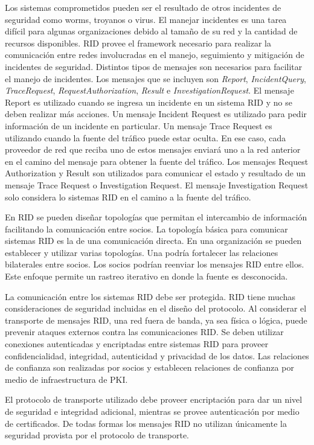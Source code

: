 Los sistemas comprometidos pueden ser el resultado de otros incidentes de 
seguridad como worms, troyanos o virus. El manejar incidentes es una tarea 
difícil para algunas organizaciones debido al tamaño de su red y la cantidad de 
recursos disponibles. RID provee el framework necesario para realizar la 
comunicación entre redes involucradas en el manejo, seguimiento y mitigación de 
incidentes de seguridad. Distintos tipos de mensajes son necesarios para 
facilitar el manejo de incidentes. Los mensajes que se incluyen son 
\emph{Report}, \emph{IncidentQuery}, \emph{TraceRequest}, 
\emph{RequestAuthorization}, \emph{Result} e \emph{InvestigationRequest}. El 
mensaje Report es utilizado cuando se ingresa un incidente en un sistema RID y 
no se deben realizar más acciones. Un mensaje Incident Request es utilizado para 
pedir información de un incidente en particular. Un mensaje Trace Request es 
utilizando cuando la fuente del tráfico puede estar oculta. En ese caso, cada 
proveedor de red que reciba uno de estos mensajes enviará uno a la red anterior 
en el camino del mensaje para obtener la fuente del tráfico. Los mensajes 
Request Authorization y Result son utilizados para comunicar el estado y 
resultado de un mensaje Trace Request o Investigation Request. El mensaje 
Investigation Request solo considera lo sistemas RID en el camino a la fuente 
del tráfico.

En RID se pueden diseñar topologías que permitan el intercambio de información 
facilitando la comunicación entre socios. La topología básica para comunicar 
sistemas RID es la de una comunicación directa. En una organización se pueden 
establecer y utilizar varias topologías. Una podría fortalecer las relaciones 
bilaterales entre socios. Los socios podrían reenviar los mensajes RID entre 
ellos. Este enfoque permite un rastreo iterativo en donde la fuente es 
desconocida.

La comunicación entre los sistemas RID debe ser protegida. RID tiene muchas 
consideraciones de seguridad incluidas en el diseño del protocolo. Al considerar 
el transporte de mensajes RID, una red fuera de banda, ya sea física o lógica, 
puede prevenir ataques externos contra las comunicaciones RID. Se deben utilizar 
conexiones autenticadas y encriptadas entre sistemas RID para proveer 
confidencialidad, integridad, autenticidad y privacidad de los datos. Las 
relaciones de confianza son realizadas por socios y establecen relaciones de 
confianza por medio de infraestructura de PKI.

El protocolo de transporte utilizado debe proveer encriptación para dar un nivel 
de seguridad e integridad adicional, mientras se provee autenticación por medio 
de certificados. De todas formas los mensajes RID no utilizan únicamente la 
seguridad provista por el protocolo de transporte.

